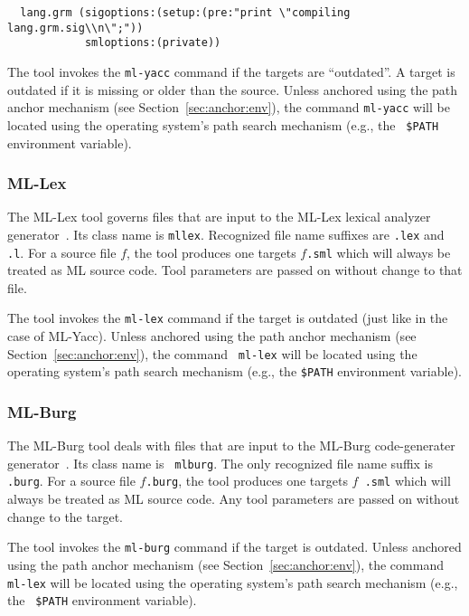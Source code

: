 \documentclass[titlepage,letterpaper]{article}
\begin{document}
\begin{verbatim}
  lang.grm (sigoptions:(setup:(pre:"print \"compiling lang.grm.sig\\n\";"))
            smloptions:(private))
\end{verbatim}

The tool invokes the {\tt ml-yacc} command if the targets are
``outdated''.  A target is outdated if it is missing or older than the
source.  Unless anchored using the path anchor mechanism (see
Section~\ref{sec:anchor:env}), the command {\tt ml-yacc} will be located
using the operating system's path search mechanism (e.g., the {\tt
\$PATH} environment variable).

\subsubsection{ML-Lex}

The ML-Lex tool governs files that are input to the ML-Lex lexical
analyzer generator~\cite{appel89:lex}.  Its class name is {\tt mllex}.
Recognized file name suffixes are {\tt .lex} and {\tt .l}.  For a
source file $f$, the tool produces one targets $f${\tt .sml} which
will always be treated as ML source code.  Tool parameters are passed
on without change to that file.

The tool invokes the {\tt ml-lex} command if the target is outdated
(just like in the case of ML-Yacc).  Unless anchored using the path
anchor mechanism (see Section~\ref{sec:anchor:env}), the command {\tt
ml-lex} will be located using the operating system's path search
mechanism (e.g., the {\tt \$PATH} environment variable).

\subsubsection{ML-Burg}

The ML-Burg tool deals with files that are input to the ML-Burg
code-generater generator~\cite{mlburg93}.  Its class name is {\tt
mlburg}.  The only recognized file name suffix is {\tt .burg}.  For a
source file $f${\tt .burg}, the tool produces one targets $f${\tt
.sml} which will always be treated as ML source code.  Any tool
parameters are passed on without change to the target.

The tool invokes the {\tt ml-burg} command if the target is outdated.
Unless anchored using the path anchor mechanism (see
Section~\ref{sec:anchor:env}), the command {\tt ml-lex} will be located
using the operating system's path search mechanism (e.g., the {\tt
\$PATH} environment variable).
\end{document}
